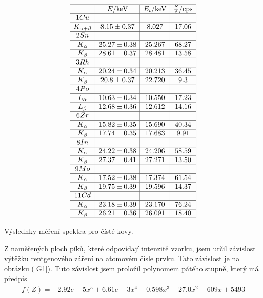 \documentclass[a4paper,12pt]{article}
\begin{document}
\begin{table}
$$
\begin{array}{|c|c|c|c|}
\hline
&   E/\mbox{keV}&   E_t/\mbox{keV}&   \frac{S}{t}/\mbox{cps} \\ \hline
1 Cu&&& \\ \hline
K_{\alpha + \beta}& 8.15\pm 0.37&   8.027&   17.06 \\ \hline
2 Sn&&& \\ \hline
K_\alpha&   25.27\pm 0.38&  25.267&   68.27 \\ \hline
K_\beta&    28.61\pm 0.37&  28.481&   13.58 \\ \hline
3 Rh&&& \\ \hline
K_\alpha&   20.24\pm 0.34&  20.213&   36.45 \\ \hline
K_\beta&    20.8\pm 0.37&    22.720&   9.3 \\ \hline
4 Po&&& \\ \hline
L_\alpha&   10.63\pm 0.34&  10.550&   17.23 \\ \hline
L_\beta&    12.68\pm 0.36&  12.612&   14.16 \\ \hline
6 Zr&&& \\ \hline
K_\alpha&   15.82\pm 0.35&  15.690&   40.34 \\ \hline
K_\beta&    17.74\pm 0.35&  17.683&   9.91 \\ \hline
8 In&&& \\ \hline
K_\alpha&   24.22\pm 0.38&   24.206&   58.59 \\ \hline
K_\beta&   27.37\pm 0.41&   27.271&   13.50 \\ \hline
9 Mo&&& \\ \hline
K_\alpha&   17.52\pm 0.38&  17.374&   61.54 \\ \hline
K_\beta&    19.75\pm 0.39&  19.596&   14.37 \\ \hline
11 Cd&&& \\ \hline
K_\alpha&   23.18\pm 0.39&  23.170&   76.24 \\ \hline
K_\beta&    26.21\pm 0.36&  26.091&   18.40 \\ \hline
\end{array}
$$
\caption{Výslednky měření spektra pro čísté kovy.}
\label{TKovy}
\end{table}

Z naměřených ploch píků, které odpovídají intenzitě vzorku, jsem určil závislost výtěžku rentgenového záření na atomovém čísle prvku. Tato závislost je na obrázku (\ref{G1}). Tuto závislost jsem proložil polynomem pátého stupně, který má předpis
\begin{eqnarray}
f(Z)=-2.92e-5x^5+6.61e-3x^4-0.598x^3+27.0x^2-609x+5493
\end{eqnarray}
\end{document}
